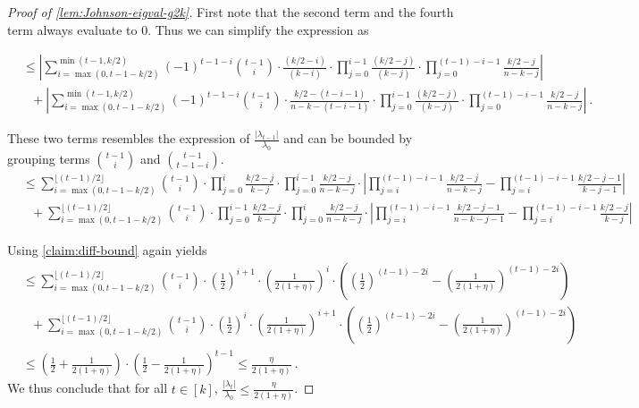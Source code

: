 \documentclass[10pt,a4paper]{article}
\newcommand{\prettyref}[1]{\cref{#1}}
\theoremstyle{definition}
\theoremstyle{remark}
\newcommand{\abs}[1]{\lvert#1\rvert}
\renewcommand{\le}{\leqslant}
\numberwithin{equation}{section}
\let\pref=\prettyref
\newcommand{\fl}[1]{\lfloor #1 \rfloor}
\begin{document}
\begin{proof}[Proof of \pref{lem:Johnson-eigval-g2k}]
    First note that the second term and the fourth term always evaluate to $0$. Thus we can simplify the expression as 

    \begin{align*}
        &\le\left|\sum_{i=\max(0,t-1-k/2) }^{ \min(t-1,k/2)} (-1)^{t-1-i}\binom{t-1}{i}\cdot \frac{ (k/2-i)}{(k-i)} \cdot  \prod_{j=0}^{i-1} \frac{ (k/2-j)}{(k-j)} \cdot \prod_{j=0}^{(t-1)-i-1} \frac{  k/2-j}{ n-k-j} \right| \\
        &~~~+\left|\sum_{i=\max(0,t-1-k/2) }^{ \min(t-1,k/2)} (-1)^{t-1-i} \binom{t-1}{i} \cdot \frac{  k/2-(t-i-1)}{ n-k-(t-i-1)}\cdot \prod_{j=0}^{i-1} \frac{ (k/2-j)}{(k-j)} \cdot \prod_{j=0}^{(t-1)-i-1} \frac{  k/2-j}{ n-k-j} \right|~.
    \end{align*}

    These two terms resembles the expression of $\frac{\abs{\lambda_{t-1}}}{\lambda_0}$ and can be bounded by grouping terms $\binom{t-1}{i}$ and $\binom{t-1}{t-1-i}$.
    \begin{align*}
        &\le \sum_{i=\max(0,t-1-k/2)}^{\fl{(t-1)/2}} \binom{t-1}{i}  \cdot    \prod_{j=0}^{i}\frac{ k/2-j}{k-j} \cdot \prod_{j=0}^{i-1} \frac{ k/2-j}{n-k-j}  \cdot \left|\prod_{j=i}^{(t-1)-i-1}\frac{k/2-j}{ n-k-j} - \prod_{j=i}^{(t-1)-i-1} \frac{k/2-j-1}{k-j-1} \right| \\
        &~~~+\sum_{i=\max(0,t-1-k/2)}^{\fl{(t-1)/2}} \binom{t-1}{i}  \cdot    \prod_{j=0}^{i-1}\frac{ k/2-j}{k-j} \cdot \prod_{j=0}^{i} \frac{ k/2-j}{n-k-j}  \cdot \left|\prod_{j=i}^{(t-1)-i-1}\frac{k/2-j-1}{ n-k-j-1} - \prod_{j=i}^{(t-1)-i-1} \frac{k/2-j}{k-j} \right|
    \end{align*}

    Using \pref{claim:diff-bound} again yields 
    \begin{align*}
        &\le \sum_{i=\max(0,t-1-k/2)}^{\fl{(t-1)/2}} \binom{t-1}{i}  \cdot  \left(\frac{1}{2}\right)^{i+1}\cdot \left(\frac{1}{2(1+\eta)}\right)^{i} \cdot \left(\left(\frac{1}{2}\right)^{(t-1)-2i}  - \left(\frac{1}{2(1+\eta)}\right)^{(t-1)-2i} \right) \\
        &~~~+\sum_{i=\max(0,t-1-k/2)}^{\fl{(t-1)/2}} \binom{t-1}{i}  \cdot  \left(\frac{1}{2}\right)^{i}\cdot \left(\frac{1}{2(1+\eta)}\right)^{i+1} \cdot \left(\left(\frac{1}{2}\right)^{(t-1)-2i}  - \left(\frac{1}{2(1+\eta)}\right)^{(t-1)-2i} \right)\\
        &\le \left(\frac{1}{2}+\frac{1}{2(1+\eta)}\right)\cdot \left(\frac{1}{2} - \frac{1}{2(1+\eta)} \right)^{t-1} \le\frac{\eta}{2(1+\eta)}~.
    \end{align*}
    We thus conclude that for all $t\in[k]$, $\frac{\abs{\lambda_t}}{\lambda_0}\le \frac{\eta}{2(1+\eta)}$.
\end{proof}  
\end{document}
